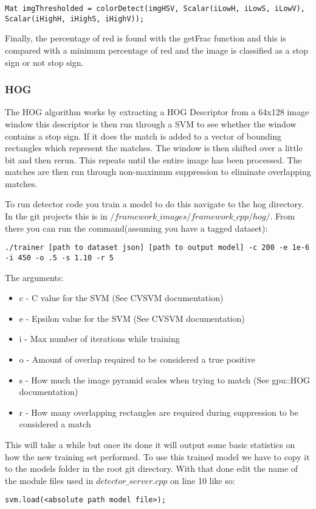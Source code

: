 \documentclass[letterpaper,10pt,titlepage]{article}
\begin{document}
\begin{lstlisting}
Mat imgThresholded = colorDetect(imgHSV, Scalar(iLowH, iLowS, iLowV), Scalar(iHighH, iHighS, iHighV));
\end{lstlisting}

Finally, the percentage of red is found with the getFrac function and this is
compared with a minimum percentage of red and the image is classified as a 
stop sign or not stop sign. 
\subsubsection*{HOG}
The HOG algorithm works by extracting a HOG Descriptor from a 64x128 image window
this descriptor is then run through a SVM to see whether the window contains a 
stop sign. If it does the match is added to a vector of bounding rectangles which
represent the matches. The window is then shifted over a little bit and then rerun.
This repeats until the entire image has been processed. The matches are then run 
through non-maximum suppression to eliminate overlapping matches.

To run detector code you train a model to do this navigate to the hog directory. In
the git projects this is in $/framework\_images/framework\_cpp/hog/$. From there you can
run the command(assuming you have a tagged dataset):
\begin{lstlisting}
./trainer [path to dataset json] [path to output model] -c 200 -e 1e-6 -i 450 -o .5 -s 1.10 -r 5
\end{lstlisting}
The arguments:
\begin{itemize}
    \item c - C value for the SVM (See CVSVM documentation)
    \item e - Epsilon value for the SVM (See CVSVM documentation)
    \item i - Max number of iterations while training
    \item o - Amount of overlap required to be considered a true positive
    \item s - How much the image pyramid scales when trying to match (See gpu::HOG documentation)
    \item r - How many overlapping rectangles are required during suppression to be considered a match
\end{itemize}

This will take a while but once its done it will output some basic statistics 
on how the new training set performed. To use this trained model we have to copy it
to the models folder in the root git directory. With that done edit the name of the
module files used in $detector\_server.cpp$ on line 10 like so:
\begin{lstlisting}
svm.load(<absolute path model file>); 
\end{lstlisting}
\end{document}
